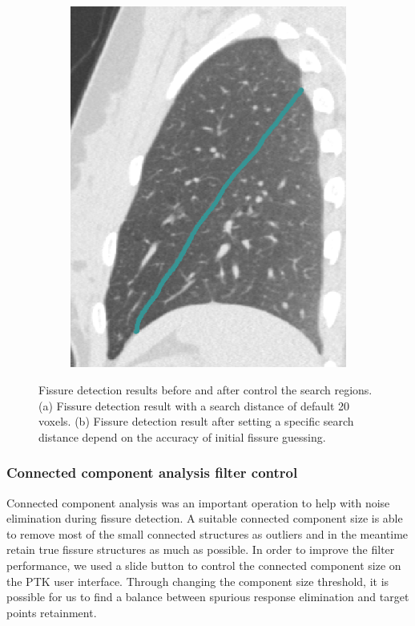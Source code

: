 {\begin{figure}[htbp]
\begin{subfigure}{.33\linewidth}
  \includegraphics[width=\linewidth,trim={{.0\wd0} {.0\wd0} {.0\wd0} {.0\wd0}},clip]{Segmentation/Image/AfterChangeSearchRegion.png}
  \caption{}
  \label{fig:SearchRegionControl-b} 
\end{subfigure}
\caption{Fissure detection results before and after control the search regions. (a) Fissure detection result with a search distance of default 20 voxels. (b) Fissure detection result after setting a specific search distance depend on the accuracy of initial fissure guessing.}
\label{fig:SearchRegionControl}
\end{figure}

\subsubsection{Connected component analysis filter control}
Connected component analysis was an important operation to help with noise elimination during fissure detection. A suitable connected component size is able to remove most of the small connected structures as outliers and in the meantime retain true fissure structures as much as possible. In order to improve the filter performance, we used a slide button to control the connected component size on the PTK user interface. Through changing the component size threshold, it is possible for us to find a balance between spurious response elimination and target points retainment. 

}
